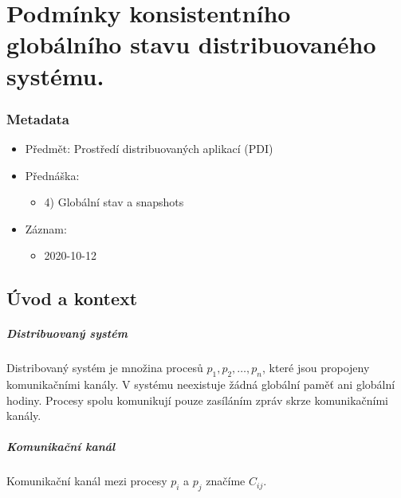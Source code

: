 

\chapter{Podmínky konsistentního globálního stavu distribuovaného systému.}



\subsection*{Metadata}

\begin{itemize}
    \item Předmět: Prostředí distribuovaných aplikací (PDI)
    \item Přednáška:
    \begin{itemize}
        \item 4) Globální stav a snapshots
    \end{itemize}
    \item Záznam:
    \begin{itemize}
        \item 2020-10-12
    \end{itemize}
\end{itemize}


\section{Úvod a kontext}

\paragraph*{Distribuovaný systém} Distribovaný systém je množina procesů $p_1, p_2, \dots, p_n$, které jsou propojeny komunikačními kanály. V systému neexistuje žádná globální paměť ani globální hodiny. Procesy spolu komunikují pouze zasíláním zpráv skrze komunikačními kanály.

\paragraph*{Komunikační kanál} Komunikační kanál mezi procesy $p_i$ a $p_j$ značíme $C_{ij}$.

